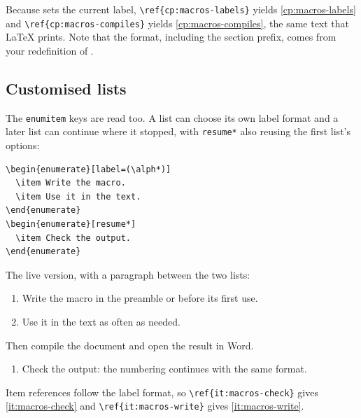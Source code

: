 \label{cp:macros-compiles}
\label{cp:macros-labels}

Because  sets the current label, \verb|\ref{cp:macros-labels}|
yields \ref{cp:macros-labels} and \verb|\ref{cp:macros-compiles}| yields
\ref{cp:macros-compiles}, the same text that \LaTeX{} prints. Note that the format,
including the section prefix, comes from your redefinition of .

\subsection{Customised lists}

The \texttt{enumitem} keys are read too. A list can choose its own label format and a
later list can continue where it stopped, with \texttt{resume*} also reusing the first
list's options:

\begin{verbatim}
\begin{enumerate}[label=(\alph*)]
  \item Write the macro.
  \item Use it in the text.
\end{enumerate}
\begin{enumerate}[resume*]
  \item Check the output.
\end{enumerate}
\end{verbatim}

The live version, with a paragraph between the two lists:

\begin{enumerate}[label=(\alph*)]
  \item Write the macro in the preamble or before its first use.\label{it:macros-write}
  \item Use it in the text as often as needed.
\end{enumerate}
Then compile the document and open the result in Word.
\begin{enumerate}[resume*]
  \item Check the output: the numbering continues with the same format.\label{it:macros-check}
\end{enumerate}

Item references follow the label format, so \verb|\ref{it:macros-check}| gives
\ref{it:macros-check} and \verb|\ref{it:macros-write}| gives \ref{it:macros-write}.

